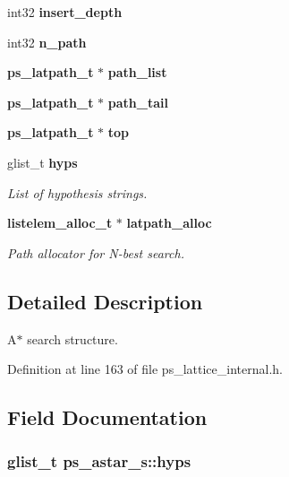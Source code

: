 \begin{DoxyCompactItemize}
\item 
int32 {\bfseries insert\-\_\-depth}\label{structps__astar__s_a50798b1396b3f565b2584ffeb1245b5d}

\item 
int32 {\bfseries n\-\_\-path}\label{structps__astar__s_a12ba7d143c867b1f1e55dfdfae3e6236}

\item 
{\bf ps\-\_\-latpath\-\_\-t} $\ast$ {\bfseries path\-\_\-list}\label{structps__astar__s_a4474da488f4e1545d395c65c39679b8c}

\item 
{\bf ps\-\_\-latpath\-\_\-t} $\ast$ {\bfseries path\-\_\-tail}\label{structps__astar__s_abbfec3e490a6bfd56b75ec419ad9f058}

\item 
{\bf ps\-\_\-latpath\-\_\-t} $\ast$ {\bfseries top}\label{structps__astar__s_aa995e464c2df2594824602e55afb25a8}

\item 
glist\-\_\-t {\bf hyps}
\begin{DoxyCompactList}\small\item\em List of hypothesis strings. \end{DoxyCompactList}\item 
{\bf listelem\-\_\-alloc\-\_\-t} $\ast$ {\bf latpath\-\_\-alloc}
\begin{DoxyCompactList}\small\item\em Path allocator for N-\/best search. \end{DoxyCompactList}\end{DoxyCompactItemize}


\subsection{Detailed Description}
A$\ast$ search structure. 

Definition at line 163 of file ps\-\_\-lattice\-\_\-internal.\-h.



\subsection{Field Documentation}
\subsubsection[{hyps}]{\setlength{\rightskip}{0pt plus 5cm}glist\-\_\-t ps\-\_\-astar\-\_\-s\-::hyps}\label{structps__astar__s_ace603617a74a81575519ae1bb94720c4}


